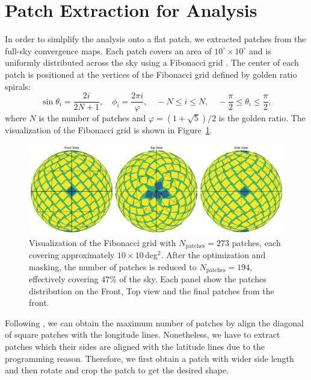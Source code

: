 \section{Patch Extraction for Analysis}
In order to simlplify the analysis onto a flat patch, we extracted patches from the full-sky convergence maps. Each patch covers an area of $10^\circ \times 10^\circ$ and is uniformly distributed across the sky using a Fibonacci grid \citep{2006QJRMS.132.1769S, 2023MNRAS.524.5591F}. The center of each patch is positioned at the vertices of the Fibonacci grid defined by golden ratio spirals:
\begin{equation}
    \sin \theta_i = \frac{2i}{2N + 1}, \quad \phi_i = \frac{2 \pi i}{\varphi}, \quad -N \leq i \leq N, \quad -\frac{\pi}{2} \leq \theta_i \leq \frac{\pi}{2},
\end{equation}
where $N$ is the number of patches and $\varphi = (1 + \sqrt{5})/2$ is the golden ratio. The visualization of the Fibonacci grid is shown in Figure~\ref{fig:fibonacci}.
\begin{figure}[ht]
    \centering
    \includegraphics[width=\textwidth]{figures/fibonacci_grid.png}
    \caption{Visualization of the Fibonacci grid with $N_{\text{patches}} = 273$ patches, each covering approximately $10 \times 10$\,deg$^2$. 
    After the optimization and masking, the number of patches is reduced to $N_{\text{patches}} = 194$, effectively covering $47 \%$ of the sky.
    Each panel show the patches distribution on the Front, Top view and the final patches from the front.}\label{fig:fibonacci}
\end{figure}

Following \citet{2023MNRAS.524.5591F}, we can obtain the maximum number of patches by align the diagonal of square patches with the longitude lines. Nonetheless, we have to extract patches which their sides are aligned with the latitude lines due to the programming reason. Therefore, we first obtain a patch with wider side length and then rotate and crop the patch to get the desired shape.

